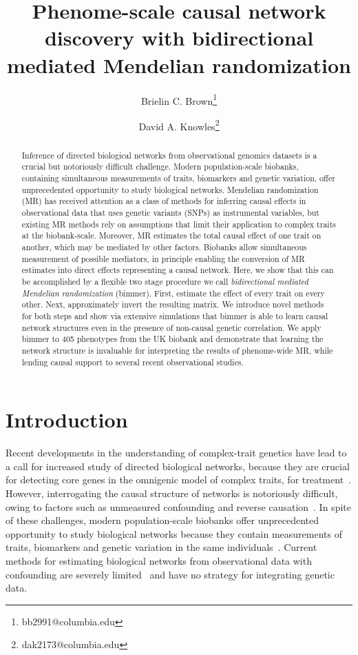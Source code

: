 \documentclass{article}
\title{Phenome-scale causal network discovery with
bidirectional mediated Mendelian randomization}
\author[1, 2]{Brielin C. Brown\thanks{bb2991@columbia.edu}}
\author[2, 3, 4]{David A. Knowles\thanks{dak2173@columbia.edu}}
\affil[1]{Data Science Institute, Columbia University, New York, NY}
\affil[2]{New York Genome Center, New York, NY}
\affil[3]{Department of Computer Science, Columbia University, New York, NY}
\affil[4]{Department of Systems Biology, Columbia University, New York, NY}
\date{}
\begin{document}
\maketitle

\begin{abstract}
Inference of directed biological networks from observational genomics datasets is a crucial
but notoriously difficult challenge. Modern population-scale biobanks, containing simultaneous
measurements of traits, biomarkers and genetic variation, offer unprecedented opportunity
to study biological networks. Mendelian randomization (MR) has received attention as a class
of methods for inferring causal effects in observational data that uses genetic variants (SNPs)
as instrumental variables, but existing MR methods rely on assumptions that limit their application
to complex traits at the biobank-scale. Moreover, MR estimates the total causal effect of one trait 
on another, which may be mediated by other factors. Biobanks allow simultaneous measurement 
of possible mediators, in principle enabling the conversion of MR estimates into direct effects 
representing a causal network.
Here, we show that this can be accomplished by a flexible two stage procedure we call
\emph{bidirectional mediated Mendelian randomization} (bimmer). First,
estimate the effect of every trait on every other. Next, approximately invert the resulting matrix.
We introduce novel methods for both steps and show via extensive simulations that bimmer is able
to learn causal network structures even in the presence of non-causal 
genetic correlation. We apply bimmer to 405 
phenotypes from the UK biobank and demonstrate that learning the network structure is invaluable 
for interpreting the results of phenome-wide MR, while lending causal support to several
recent observational studies.
\end{abstract}

\section{Introduction}
Recent developments in the understanding of complex-trait genetics have
lead to a call for increased study of directed biological networks, because they are
crucial for detecting core genes in the omnigenic model of complex traits,
for treatment~\cite{Boyle2017,Liu2019,Wray2018}.
However, interrogating the causal structure of networks is notoriously difficult,
owing to factors such as unmeasured confounding and reverse causation~\cite{Parsana2019}.
In spite of these challenges, modern population-scale biobanks 
offer unprecedented opportunity to study biological networks
 because they contain measurements of
traits, biomarkers and genetic variation in the same individuals~\cite{Sudlow2015,Nagai2017}.
Current methods for estimating biological networks from observational data with confounding
are severely limited~\cite{Chandrasekaran2012,Frot2019a,Frot2019b,Stegle2011} and have no strategy
for integrating genetic data.
\end{document}
